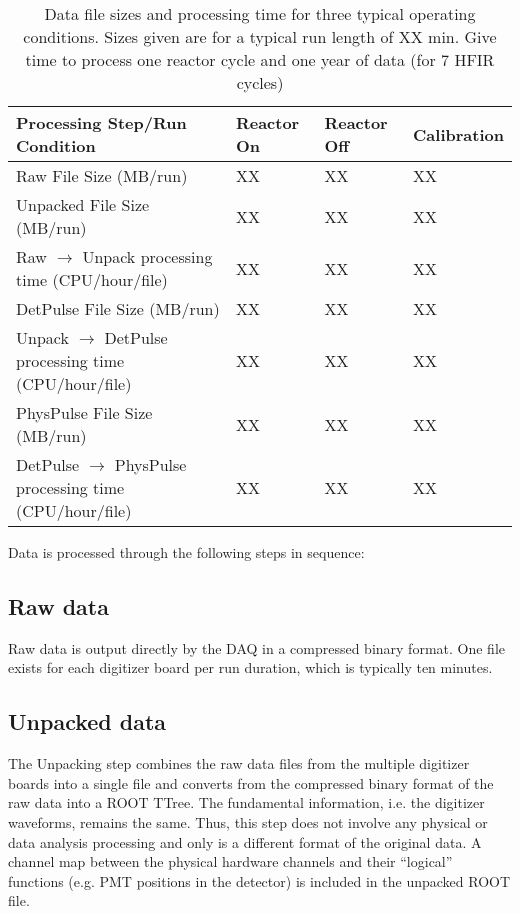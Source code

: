 
\begin{table*}[tbp]
  \begin{centering}
  \begin{tabular}{l|lll}
  Processing Step/Run Condition& Reactor On & Reactor Off & Calibration \\ \hline
  Raw File Size (MB/run) & XX & XX &  XX \\
  Unpacked File Size (MB/run) & XX & XX &  XX \\
  Raw $\rightarrow$ Unpack processing time (CPU/hour/file)& XX & XX &  XX \\
  DetPulse File Size (MB/run) & XX & XX &  XX \\
  Unpack $\rightarrow$ DetPulse processing time (CPU/hour/file)& XX & XX &  XX \\
  PhysPulse File Size (MB/run) & XX & XX &  XX \\
  DetPulse $\rightarrow$ PhysPulse processing time (CPU/hour/file)& XX & XX &  XX \\
  \end{tabular}
  \caption[dataRates]
  {Data file sizes and processing time for three typical operating conditions. Sizes given are for a typical run length of XX min. Give time to process one reactor cycle and one year of data (for 7 HFIR cycles)}
  \label{tab:dataSize}
  \end{centering}
\end{table*}

Data is processed through the following steps in sequence:

\subsection{Raw data}

Raw data is output directly by the DAQ in a compressed binary format. One file exists for each digitizer board per run duration, which is typically ten minutes.

\subsection{Unpacked data}

The Unpacking step combines the raw data files from the multiple digitizer boards into a single file and converts from the compressed binary format of the raw data into a ROOT TTree.
The fundamental information, i.e. the digitizer waveforms, remains the same.
Thus, this step does not involve any physical or data analysis processing and only is a different format of the original data.
A channel map between the physical hardware channels and their ``logical'' functions ({e.g.} PMT positions in the detector) is included in the unpacked ROOT file.


